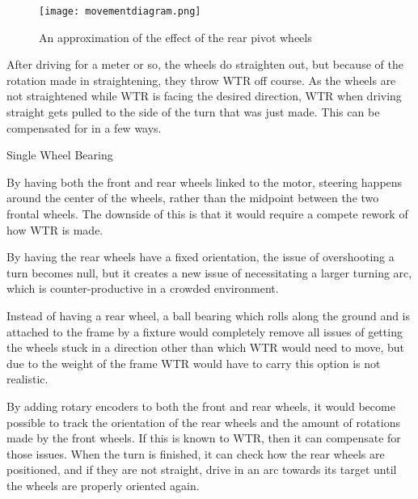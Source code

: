 \begin{figure}[H]

\texttt{[image: movementdiagram.png]}
\caption{An approximation of the effect of the rear pivot wheels}
\label{fig::mvmnt}
\end{figure}
After driving for a meter or so, the wheels do straighten out, but because of the rotation made in straightening, they throw WTR off course.
As the wheels are not straightened while WTR is facing the desired direction, WTR when driving straight gets pulled to the side of the turn that was just made.
This can be compensated for in a few ways.

\begin{labeling}{Single Wheel Bearing}
\item [Tank Controls] By having both the front and rear wheels linked to the motor, steering happens around the center of the wheels, rather than the midpoint between the two frontal wheels. The downside of this is that it would require a compete rework of how WTR is made.
\item [Fixed Rear Wheels] By having the rear wheels have a fixed orientation, the issue of overshooting a turn becomes null, but it creates a new issue of necessitating a larger turning arc, which is counter-productive in a crowded environment.
\item [Single Wheel Bearing] Instead of having a rear wheel, a ball bearing which rolls along the ground and is attached to the frame by a fixture would completely remove all issues of getting the wheels stuck in a direction other than which WTR would need to move, but due to the weight of the frame WTR would have to carry this option is not realistic.
\item [Rotary Encoders] By adding rotary encoders to both the front and rear wheels, it would become possible to track the orientation of the rear wheels and the amount of rotations made by the front wheels. If this is known to WTR, then it can compensate for those issues. When the turn is finished, it can check how the rear wheels are positioned, and if they are not straight, drive in an arc towards its target until the wheels are properly oriented again. 
\end{labeling}

\newpage
